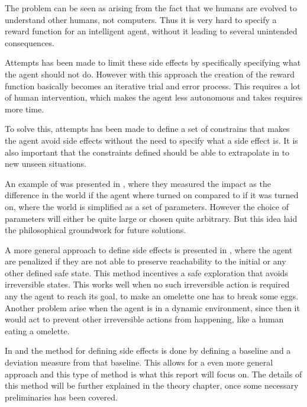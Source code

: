 \documentclass[12pt,A4]{report}
\theoremstyle{definition}
\begin{document}
The problem can be seen as arising from the fact that we humans are evolved to understand other humans, not computers. Thus it is very hard to specify a reward function for an intelligent agent, without it leading to several unintended consequences. 

Attempts has been made to limit these side effects by specifically specifying what the agent should not do\autocite{Zhang et al}. However with this approach the creation of the reward function basically becomes an iterative trial and error process. This requires a lot of human intervention, which makes the agent less autonomous and takes requires more time. 

To solve this, attempts has been made to define a set of constrains that makes the agent avoid side effects without the need to specify what a side effect is. It is also important that the constraints defined should be able to extrapolate in to new unseen situations.

An example of was presented in \autocite{Armstrong and Levinstein}, where they measured the impact as the difference in the world if the agent where turned on compared to if it was turned on, where the world is simplified as a set of parameters. However the choice of parameters will either be quite large or chosen quite arbitrary. But this idea laid the philosophical groundwork for future solutions.

A more general approach to define side effects is presented in \autocite{Eysenbach et al}, where the agent are penalized if they are not able to preserve reachability to the initial or any other defined safe state. This method incentives a safe exploration that avoids irreversible states. This works well when no such irreversible action is required any the agent to reach its goal, to make an omelette one has to break some eggs. Another problem arise when the agent is in a dynamic environment, since then it would act to prevent other irreversible actions from happening, like a human eating a omelette. 

In \autocite{Krakovn et al 2019} and \autocite{Turner et al 2020} the method for defining side effects is done by defining a baseline and a deviation measure from that baseline. This allows for a even more general approach and this type of method is what this report will focus on. The details of this method will be further explained in the theory chapter, once some necessary preliminaries has been covered.
 
\end{document}
